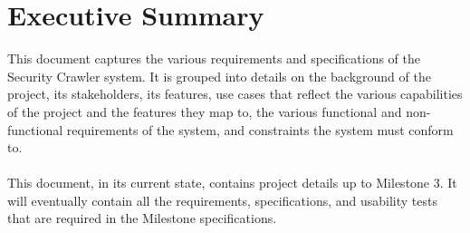 \section{Executive Summary}
This document captures the various requirements and specifications of the Security Crawler system.  It is grouped into details on the background of the project, its stakeholders, its features, use cases that reflect the various capabilities of the project and the features they map to, the various functional and non-functional requirements of the system, and constraints the system must conform to.\\\\
This document, in its current state, contains project details up to Milestone 3.  It will eventually contain all the requirements, specifications, and usability tests that are required in the Milestone specifications.\\\\

